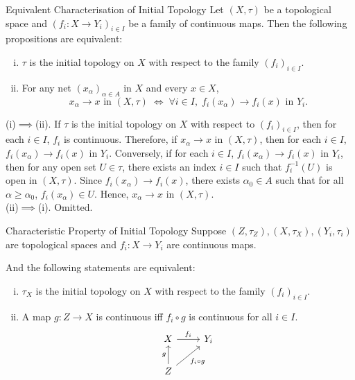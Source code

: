\documentclass{report}
\begin{document}
\begin{proposition}{Equivalent Characterisation of Initial Topology}{}
	Let $(X,\tau)$ be a topological space and $\left(f_i: X \to Y_i\right)_{i \in I}$ be a family of continuous maps. Then the following propositions are equivalent:
	\begin{enumerate}[(i)]
		\item $\tau$ is the initial topology on $X$ with respect to the family $\left(f_i\right)_{i \in I}$.
		\item For any net $\left(x_\alpha\right)_{\alpha \in A}$ in $X$ and every $x\in X$,
		\[
		x_\alpha\longrightarrow x\text{ in }(X,\tau)
		\;\Longleftrightarrow\;
		\forall i\in I,\; f_i(x_\alpha)\longrightarrow f_i(x)\text{ in }Y_i .
		\]
	\end{enumerate}
\end{proposition}
\begin{prf}
	(i)$\implies$(ii). If $\tau$ is the initial topology on $X$ with respect to $\left(f_i\right)_{i \in I}$, then for each $i\in I$, $f_i$ is continuous. Therefore, if $x_\alpha\rightarrow x$ in $(X,\tau)$, then for each $i\in I$, $f_i(x_\alpha)\rightarrow f_i(x)$ in $Y_i$. Conversely, if for each $i\in I$, $f_i(x_\alpha)\rightarrow f_i(x)$ in $Y_i$, then for any open set $U\in \tau$, there exists an index $i\in I$ such that $f_i^{-1}(U)$ is open in $(X,\tau)$. Since $f_i(x_\alpha)\rightarrow f_i(x)$, there exists $\alpha_0\in A$ such that for all $\alpha\geq \alpha_0$, $f_i(x_\alpha)\in U$. Hence, $x_\alpha\rightarrow x$ in $(X,\tau)$.\\

	(ii)$\implies$(i). Omitted.
\end{prf}

\begin{proposition}{Characteristic Property of Initial Topology}{}
	Suppose $(Z,\tau_Z), (X,\tau_X),(Y_i,\tau_i)$ are topological spaces and $f_i: X \to Y_i$ are continuous maps. 
	
	And the following statements are equivalent:
	\begin{enumerate}[(i)]
		\item $\tau_X$ is the initial topology on $X$ with respect to the family $\left(f_i\right)_{i \in I}$.
		\item A map $g:Z\to X$ is continuous iff $f_i\circ g$ is continuous for all $i \in I$. 
		\[
			\begin{tikzcd}
				X \arrow[r, "f_i"]                         & Y_i \\
				Z \arrow[u, "g"] \arrow[ru, "f_i\circ g"'] &    
			\end{tikzcd}
		\]
	\end{enumerate}
\end{proposition}
\end{document}

